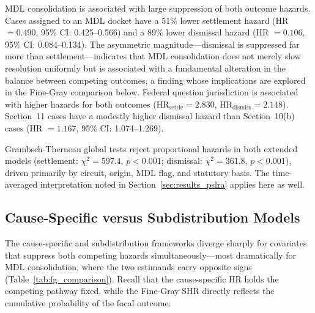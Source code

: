 MDL consolidation is associated with large suppression
of both outcome hazards. Cases assigned to an MDL docket
have a 51\% lower settlement hazard (HR $= 0.490$, 95\% CI:
0.425--0.566) and a 89\% lower dismissal hazard
(HR $= 0.106$, 95\% CI: 0.084--0.134). The asymmetric
magnitude---dismissal is suppressed far more than
settlement---indicates that MDL consolidation does not
merely slow resolution uniformly but is associated with a
fundamental alteration in
the balance between competing outcomes, a finding whose
implications are explored in the Fine-Gray comparison below.
Federal question jurisdiction is associated with higher
hazards for both outcomes ($\text{HR}_\text{settle} = 2.830$,
$\text{HR}_\text{dismiss} = 2.148$). Section~11 cases have a
modestly higher dismissal hazard than Section~10(b) cases
(HR $= 1.167$, 95\% CI: 1.074--1.269).

Grambsch-Therneau global tests reject proportional hazards
in both extended models (settlement: $\chi^2 = 597.4$,
$p < 0.001$; dismissal: $\chi^2 = 361.8$, $p < 0.001$),
driven primarily by circuit, origin, MDL flag, and statutory
basis. The time-averaged interpretation noted in
Section~\ref{sec:results_pslra} applies here as well.

\subsection{Cause-Specific versus Subdistribution Models}

The cause-specific and subdistribution frameworks diverge
sharply for covariates that suppress both competing
hazards simultaneously---most dramatically for MDL
consolidation, where the two estimands carry opposite
signs (Table~\ref{tab:fg_comparison}).
Recall that the cause-specific HR holds the competing
pathway fixed, while the Fine-Gray SHR directly reflects
the cumulative probability of the focal outcome.

